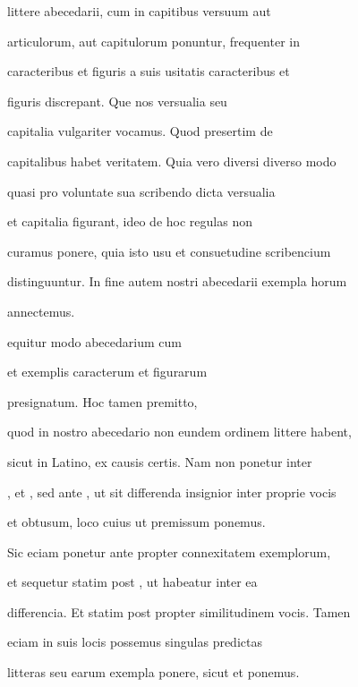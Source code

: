 littere abecedarii, cum in capitibus versuum aut

articulorum, aut capitulorum ponuntur, frequenter in

caracteribus et figuris a suis usitatis caracteribus et

figuris discrepant. Que nos versualia seu

capitalia vulgariter vocamus. Quod presertim de

capitalibus habet veritatem. Quia vero diversi diverso modo

quasi pro voluntate sua scribendo dicta versualia

et capitalia figurant, ideo de hoc regulas non

curamus ponere, quia isto usu et consuetudine scribencium

distinguuntur. In fine autem nostri abecedarii exempla horum

annectemus.

\indentP {}equitur modo abecedarium cum 

 et exemplis caracterum et figurarum

presignatum. Hoc tamen premitto,

quod in nostro abecedario non eundem ordinem littere habent,

sicut in Latino, ex causis certis. Nam  non ponetur inter

, et , sed ante , ut sit differenda insignior inter  proprie vocis

et  obtusum, loco cuius ut premissum  ponemus.

Sic eciam  ponetur ante  propter connexitatem exemplorum,

et  sequetur statim post , ut habeatur inter ea 

 differencia. Et  statim post  propter similitudinem vocis. Tamen

eciam in suis locis possemus singulas predictas

\newpage






\fullpreviouslines


{
\color{blue}

litteras seu earum exempla ponere, sicut et
ponemus.


}




